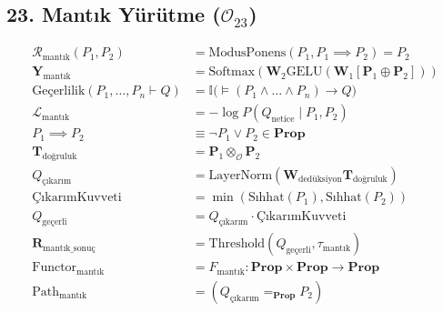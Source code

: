 \documentclass[11pt, a4paper]{article}
\begin{document}
\subsection{23. Mantık Yürütme ($\mathcal{O}_{23}$)}
\begin{align}
\mathcal{R}_{\text{mantık}}(P_1, P_2) &= \text{ModusPonens}(P_1, P_1 \implies P_2) = P_2 \\
\mathbf{Y}_{\text{mantık}} &= \text{Softmax}\left( \mathbf{W}_2 \text{GELU}(\mathbf{W}_1 [\mathbf{P}_1 \oplus \mathbf{P}_2]) \right) \\
\text{Geçerlilik}(P_1, \dots, P_n \vdash Q) &= \mathbb{I}\big( \models (P_1 \land \dots \land P_n) \to Q \big) \\
\mathcal{L}_{\text{mantık}} &= -\log P(Q_{\text{netice}} \mid P_1, P_2) \\
P_1 \implies P_2 &\equiv \neg P_1 \lor P_2 \in \mathbf{Prop} \\
\mathbf{T}_{\text{doğruluk}} &= \mathbf{P}_1 \otimes_{\mathcal{O}} \mathbf{P}_2 \\
Q_{\text{çıkarım}} &= \text{LayerNorm}(\mathbf{W}_{\text{dedüksiyon}} \mathbf{T}_{\text{doğruluk}}) \\
\text{ÇıkarımKuvveti} &= \min(\text{Sıhhat}(P_1), \text{Sıhhat}(P_2)) \\
Q_{\text{geçerli}} &= Q_{\text{çıkarım}} \cdot \text{ÇıkarımKuvveti} \\
\mathbf{R}_{\text{mantık\_sonuç}} &= \text{Threshold}(Q_{\text{geçerli}}, \tau_{\text{mantık}}) \\
\text{Functor}_{\text{mantık}} &= F_{\text{mantık}} : \mathbf{Prop} \times \mathbf{Prop} \to \mathbf{Prop} \\
\text{Path}_{\text{mantık}} &= (Q_{\text{çıkarım}} =_{\mathbf{Prop}} P_2)
\end{align}
\end{document}
